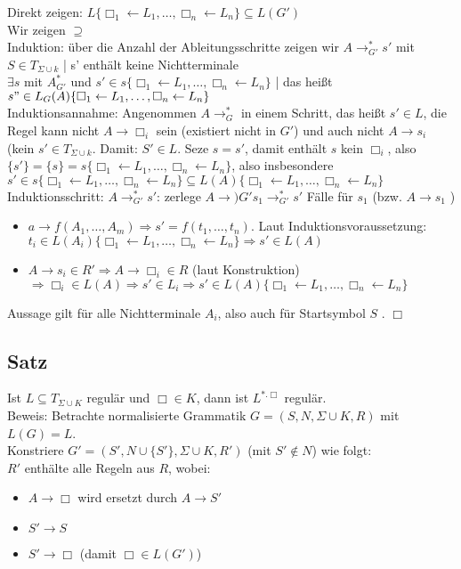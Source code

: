 \documentclass[titlepage]{article}
\begin{document}
Direkt zeigen: $L\{ \Box_1 \leftarrow L_1, \dots, \Box_n \leftarrow L_n \} \subseteq L(G')$\\
Wir zeigen \glqq $\supseteq$ \grqq\\
Induktion: \"uber die Anzahl der Ableitungsschritte zeigen wir
$A \to_{G'}^\ast s'$ mit $S \in T_{\Sigma \cup k}$ | s' enth\"alt keine Nichtterminale\\
$\exists s$ mit $A_{G'}^\ast$ und $s' \in s\{ \Box_1 \leftarrow L_1, \dots, \Box_n \leftarrow L_n \}$ |
das hei\ss t $s" \in L_G(A)\{ \Box_1 \leftarrow L_1, \dots, \Box_n \leftarrow L_n \}$\\

Induktionsannahme: Angenommen $A \to_G^\ast$ in einem Schritt, das hei\ss t $s' \in L$, die Regel
kann nicht $A \to \Box_i$ sein (existiert nicht in $G'$) und auch nicht $A \to s_i$ 
(kein $s' \in T_{\Sigma \cup k}$. Damit: $S' \in L$. Seze $s = s'$, damit enth\"alt $s$ kein $\Box_i$, also
$\{s'\} = \{s\} = s\{ \Box_1 \leftarrow L_1, \dots, \Box_n \leftarrow L_n \}$, also insbesondere
$s' \in s\{ \Box_1 \leftarrow L_1, \dots, \Box_n \leftarrow L_n \} \subseteq 
L(A)\{ \Box_1 \leftarrow L_1, \dots, \Box_n \leftarrow L_n \}$\\
Induktionsschritt: $A \to_{G'}^\ast s'$: zerlege $A \to){G'} s_1 \to^\ast_{G'} s'$
F\"alle f\"ur $s_1$ (bzw. $A \to s_1$ )
\begin{itemize}
	\item $a \to f(A_1, \dots, A_m) \Rightarrow s' = f(t_1, \dots, t_n)$. Laut Induktionsvoraussetzung:
		$t_i \in L(A_i)\{ \Box_1 \leftarrow L_1, \dots, \Box_n \leftarrow L_n \} \Rightarrow s' \in L(A)$
	\item $A \to s_i \in R' \Rightarrow A \to \Box_i \in R$ (laut Konstruktion) 
		$\Rightarrow \Box_i \in L(A) \Rightarrow s' \in L_i \Rightarrow s' \in 
		L(A)\{ \Box_1 \leftarrow L_1, \dots, \Box_n \leftarrow L_n \}$
\end{itemize}

Aussage gilt f\"ur  alle Nichtterminale $A_i$, also auch f\"ur Startsymbol $S$ . $\Box$

\subsection{Satz}

Ist $L \subseteq T_{\Sigma \cup K}$ regul\"ar und $\Box \in K$, dann ist $L^{\ast . \Box}$ regul\"ar.\\
Beweis: Betrachte normalisierte Grammatik $G = (S, N, \Sigma \cup K, R)$ mit $L(G) = L$.\\
Konstriere $G' = (S', N \cup \{S'\}, \Sigma \cup K, R')$ (mit $S' \notin N$) wie folgt:\\
$R'$ enth\"alte alle Regeln aus $R$, wobei:
\begin{itemize}
	\item $A \to \Box$ wird ersetzt durch $A \to S'$
	\item $S' \to S$
	\item $S' \to \Box$ (damit $\Box \in L(G')$)
\end{itemize}
\end{document}
